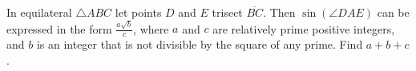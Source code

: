 In equilateral $\triangle ABC$ let points $D$ and $E$ trisect $\overline{BC}$.  Then $\sin \left( \angle DAE \right)$ can be expressed in the form $\tfrac{a\sqrt{b}}{c}$, where $a$ and $c$ are relatively prime positive integers, and $b$ is an integer that is not divisible by the square of any prime.  Find $a+b+c$.